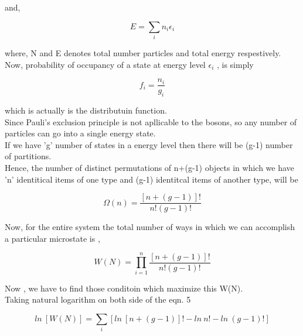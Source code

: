 \documentclass[12pt, letterpaper]{article}
\begin{document}
    and,

    \begin{equation}
        E =  \sum _{i} n_{i} \epsilon _{i  }
    \end{equation}

    where, N and E denotes total number particles and total energy respestively.\\

    Now, probability of occupancy of a state at energy level $\epsilon _{i}$ , is simply 
    
    \begin{equation}
        f_{i} = \frac{n_{i}}{g_{i}}
    \end{equation}

    which is actually is the distributuin function.\\

    Since Pauli's exclusion principle is not apllicable to the bosons, so any  number of particles can go
    into a single energy state. \\
    
    If we have 'g' number of states in a energy level then there will be (g-1) number of partitions.\\
    
    Hence, the number of distinct permutations of {n+(g-1)} objects in which we have 'n' identitical items of one type
    and (g-1) identitcal items of another type, will be 

    \begin{equation}
        \Omega(n) =  \frac{[n+(g-1)]!}{n!(g-1)!}
    \end{equation}

    Now, for the entire system the total number of ways in which we can accomplish a particular microstate 
    is , 
    
    \begin{equation}
        W(N) =\prod ^{n} _{i=1}  \frac{[n+(g-1)]!}{n!(g-1)!}
    \end{equation}
    
    Now , we have to find those conditoin which maximize this W(N). \\ 
    
    Taking natural logarithm on both side of the eqn. 5

    \begin{equation}
       ln \ [W(N)] =\sum_{i}  [ln \ [n+(g-1)]! - ln \ n! - ln \ (g-1)!]
    \end{equation}
\end{document}
